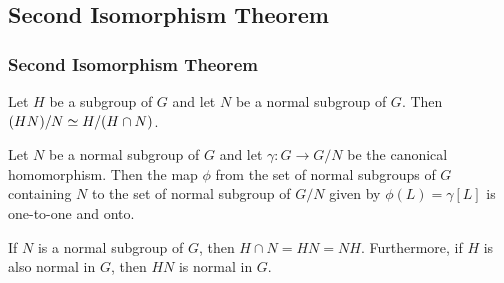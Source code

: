\subsection{Second Isomorphism Theorem}
\begin{frame}
\frametitle{Second Isomorphism Theorem}
\begin{theorem}
	Let $H$ be a subgroup of $G$ and let $N$ be a normal subgroup of $G$.
	Then $(HN)/N \simeq H/(H\cap N)$.
\end{theorem}
\begin{lemma}
	Let $N$ be a normal subgroup of $G$ and let $\gamma : G \to G/N$ be the canonical homomorphism.
	Then the map $\phi$ from the set of normal subgroups of $G$ containing $N$ to the set of normal subgroup of $G/N$ given by $\phi(L) = \gamma[L]$ is one-to-one and onto.
\end{lemma}
\begin{lemma}
	If $N$ is a normal subgroup of $G$, then $H \cap N = HN = NH$.
	Furthermore, if $H$ is also normal in $G$, then $HN$ is normal in $G$.
\end{lemma}
\end{frame}

\begin{frame}
	\begin{figure}
	\end{figure}
\end{frame}
